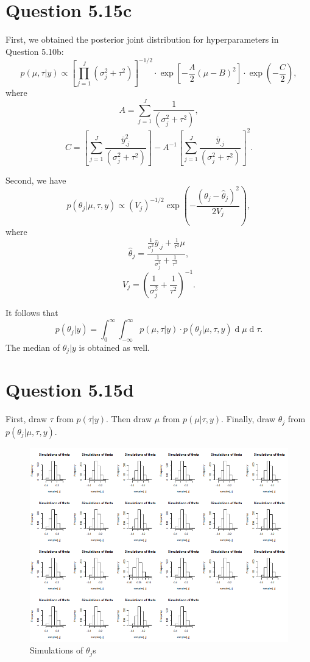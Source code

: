 \documentclass{article}
\DeclareMathOperator*{\deriv}{d}
\begin{document}
\section*{Question 5.15c}
{
    First, we obtained the posterior joint distribution for hyperparameters in Question 5.10b:
    $$p(\mu, \tau | y) \propto \left[ \prod_{j=1}^{J} {(\sigma_j^2 + \tau^2)} \right]^{-1/2} \cdot \exp{\left[ -\frac{A}{2} (\mu-B)^2 \right]} \cdot \exp{(-\frac{C}{2})},$$
    where $$A = \sum_{j=1}^{J} {\frac{1}{(\sigma_j^2 + \tau^2)}},$$
    $$C = \left[ \sum_{j=1}^{J} {\frac{\bar{y}_{.j}^2}{(\sigma_j^2 + \tau^2)}} \right] - A^{-1} \left[ \sum_{j=1}^{J} {\frac{\bar{y}_{.j}}{(\sigma_j^2 + \tau^2)}} \right]^2 .$$

    Second, we have 
    $$p(\theta_j | \mu, \tau, y) \propto (V_j)^{-1/2} \exp{(-\frac{(\theta_j - \hat{\theta}_j)^2}{2V_j})}, $$
    where $$\hat{\theta}_j = \frac{\frac{1}{\sigma_j^2} \bar{y}_{.j} + \frac{1}{\tau^2} \mu}{\frac{1}{\sigma_j^2} + \frac{1}{\tau^2}}, $$
    $$V_j = \left( \frac{1}{\sigma_j^2} + \frac{1}{\tau^2} \right)^{-1}.$$

    It follows that 
    $$p(\theta_j | y) = \int_{0}^{\infty} {\int_{-\infty}^{\infty} {p(\mu, \tau | y) \cdot p(\theta_j | \mu, \tau, y) \deriv{\mu}} \deriv{\tau}}.$$ The median of $\theta_j | y$ is obtained as well.
}

\section*{Question 5.15d}
{
    First, draw $\tau$ from $p(\tau | y)$. Then draw $\mu$ from $p(\mu | \tau, y)$. Finally, draw $\theta_j$ from $p(\theta_j | \mu, \tau, y)$.

    \begin{figure}[H]
        \centering
        \includegraphics[width = 1.0\linewidth]{theta.simulations.png}
        \caption{Simulations of $\theta_j$s}
    \end{figure}
}
\end{document}
